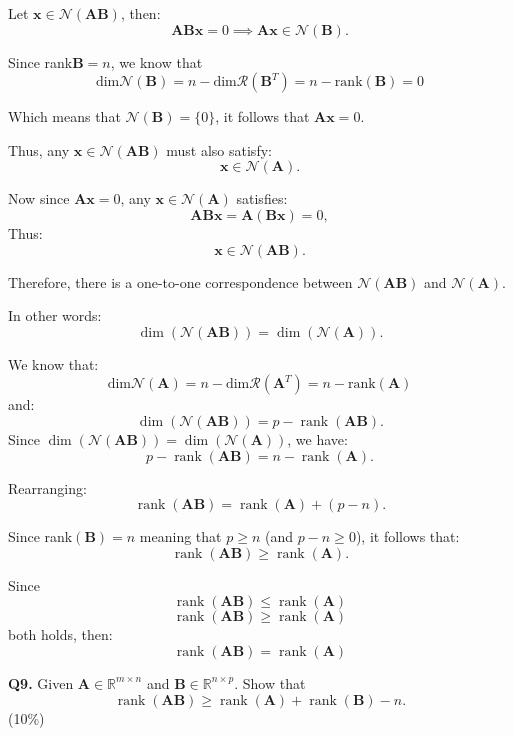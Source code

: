 \documentclass[12pt]{article}
\newcommand{\bmat}[1]{\mathbf{#1}} %
\begin{document}
Let \(\bmat{x} \in \mathcal{N}(\bmat{AB})\), then:
   \[
   \bmat{ABx} = 0 \implies \bmat{Ax} \in \mathcal{N}(\bmat{B}).
   \]

Since rank$\bmat{B} = n$, we know that
\[
\text{dim}\mathcal{N}(\bmat{B}) = n-\text{dim}\mathcal{R}(\bmat{B}^T) = n -\text{rank}(\bmat{B}) = 0
\]

Which means that \(\mathcal{N}(\bmat{B}) = \{ 0 \}\), it follows that \(\bmat{Ax} = 0\). 

Thus, any \(\bmat{x} \in \mathcal{N}(\bmat{AB})\) must also satisfy:
   \[
   \bmat{x} \in \mathcal{N}(\bmat{A}).
   \]

Now since \(\bmat{Ax} = 0\), any \(\bmat{x} \in \mathcal{N}(\bmat{A})\) satisfies:
   \[
   \bmat{ABx} = \bmat{A}(\bmat{Bx}) = 0,
   \]
Thus:
\[
\bmat{x} \in \mathcal{N}(\bmat{AB}).
\]

Therefore, there is a one-to-one correspondence between \(\mathcal{N}(\bmat{AB})\) and \(\mathcal{N}(\bmat{A})\).

In other words:
\[
\dim(\mathcal{N}(\bmat{AB})) = \dim(\mathcal{N}(\bmat{A})).
\]


We know that:
\[
\text{dim}\mathcal{N}(\bmat{A}) = n-\text{dim}\mathcal{R}(\bmat{A}^T) = n -\text{rank}(\bmat{A})
\]
and:
\[
\dim(\mathcal{N}(\bmat{AB})) = p - \operatorname{rank}(\bmat{AB}).
\]
Since \( \dim(\mathcal{N}(\bmat{AB})) = \dim(\mathcal{N}(\bmat{A})) \), we have:
\[
p - \operatorname{rank}(\bmat{AB}) = n - \operatorname{rank}(\bmat{A}).
\]

Rearranging:
\[
\operatorname{rank}(\bmat{AB}) = \operatorname{rank}(\bmat{A}) + (p - n).
\]

Since rank$(\bmat{B}) = n$ meaning that \( p \geq n \) (and \( p - n \geq 0 \)), it follows that:
\[
\operatorname{rank}(\bmat{AB}) \geq \operatorname{rank}(\bmat{A}).
\]

Since 
\[
\operatorname{rank}(\bmat{A}\bmat{B}) \le \operatorname{rank}(\bmat{A})
\]
\[
\operatorname{rank}(\bmat{A}\bmat{B}) \ge \operatorname{rank}(\bmat{A})
\]
both holds, then:
\[
\operatorname{rank}(\bmat{A}\bmat{B}) = \operatorname{rank}(\bmat{A})
\]
\vspace{\baselineskip}
\hline
\vspace{\baselineskip}

\textbf{Q9.} Given \( \bmat{A} \in \mathbb{R}^{m \times n} \) and \( \bmat{B} \in \mathbb{R}^{n \times p} \). Show that
\[
\operatorname{rank}(\bmat{A}\bmat{B}) \geq \operatorname{rank}(\bmat{A}) + \operatorname{rank}(\bmat{B}) - n.
\] \hfill (10\%)
\vspace{\baselineskip}
\end{document}
